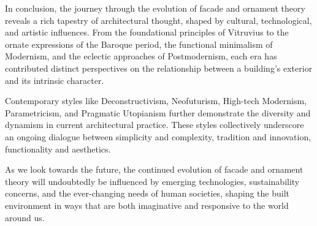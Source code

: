 In conclusion, the journey through the evolution of facade and ornament theory reveals a rich tapestry of architectural thought, shaped by cultural, technological, and artistic influences.
From the foundational principles of Vitruvius to the ornate expressions of the Baroque period, the functional minimalism of Modernism, and the eclectic approaches of Postmodernism, each era has contributed distinct perspectives on the relationship between a building's exterior and its intrinsic character.

Contemporary styles like Deconstructivism, Neofuturism, High-tech Modernism, Parametricism, and Pragmatic Utopianism further demonstrate the diversity and dynamism in current architectural practice.
These styles collectively underscore an ongoing dialogue between simplicity and complexity, tradition and innovation, functionality and aesthetics.

As we look towards the future, the continued evolution of facade and ornament theory will undoubtedly be influenced by emerging technologies, sustainability concerns, and the ever-changing needs of human societies, shaping the built environment in ways that are both imaginative and responsive to the world around us.


